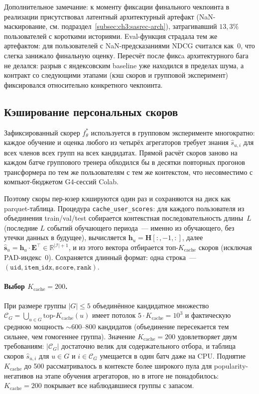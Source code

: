 Дополнительное замечание: к моменту фиксации финального чекпоинта в реализации присутствовал латентный архитектурный артефакт (NaN-маскирование, см. подраздел~\ref{subsec:ch3:sasrec-arch}), затрагивавший $13{,}3\%$ пользователей с короткими историями. Eval-функция страдала тем же артефактом: для пользователей с NaN-предсказаниями NDCG считался как~0, что слегка занижало финальную оценку. Пересчёт после фиксa архитектурного бага не делался: разрыв с яндексовским baseline уже находился в пределах шума, а контракт со следующими этапами (кэш скоров и групповой эксперимент) фиксировался относительно конкретного чекпоинта.

\subsection{Кэширование персональных скоров}\label{subsec:ch3:cache}

Зафиксированный скорер $f_\theta^\ast$ используется в групповом эксперименте многократно: каждое обучение и оценка любого из четырёх агрегаторов требует знания $\hat{s}_{u, i}$ для всех членов всех групп на всех кандидатах. Прямой расчёт скоров заново на каждом батче группового тренера обходился бы в десятки повторных прогонов трансформера по тем же пользователям с тем же контекстом, что несовместимо с компьют-бюджетом G4-сессий Colab.

Поэтому скоры пер-юзер кэшируются один раз и сохраняются на диск как parquet-таблица. Процедура \texttt{cache\_user\_scores}: для каждого пользователя из объединения train/val/test собирается контекстная последовательность длины~$L$ (последние $L$ событий обучающего периода~--- именно из обучающего, без утечки данных в будущее), вычисляется $\mathbf{h}_u = \mathbf{H}[:, -1, :]$, далее $\hat{\mathbf{s}}_u = \mathbf{h}_u \cdot \mathbf{E}^\top \in \mathbb{R}^{|\mathcal{I}| + 1}$, и из этого вектора отбирается топ-$K_{\mathrm{cache}}$ скоров (исключая PAD-индекс~0). Сохраняется длинный формат: одна строка~--- $(\mathtt{uid}, \mathtt{item\_idx}, \mathtt{score}, \mathtt{rank})$.

\paragraph{Выбор $K_{\mathrm{cache}} = 200$.} При размере группы $|G| \leq 5$ объединённое кандидатное множество $\mathcal{C}_G = \bigcup_{u \in G} \mathrm{top}\text{-}K_{\mathrm{cache}}(u)$ имеет потолок $5 \cdot K_{\mathrm{cache}} = 10^3$ и фактическую среднюю мощность $\sim 600$--$800$ кандидатов (объединение пересекается тем сильнее, чем гомогеннее группа). Значение $K_{\mathrm{cache}} = 200$ удовлетворяет двум требованиям: $|\mathcal{C}_G|$ достаточно велик для содержательного отбора, и таблица скоров $\hat{s}_{u, i}$ для $u \in G$ и $i \in \mathcal{C}_G$ умещается в один батч даже на CPU. Поднятие $K_{\mathrm{cache}}$ до 500 рассматривалось в контексте более широкого пула для popularity-негативов на этапе обучения агрегаторов, но в итоге не понадобилось: $K_{\mathrm{cache}} = 200$ покрывает все наблюдавшиеся группы с запасом.

